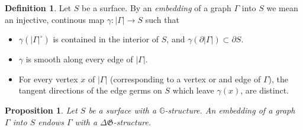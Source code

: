 \documentclass[english,11pt,leqno]{article}
\def\GG{\mathbb{G}}
\def\Gen{\mathfrak{G}}
\def\DG{ {\Delta \Gen}}
\newtheorem{prop}[thm]{Proposition}
\theoremstyle{definition}
\newtheorem{defi}[thm]{Definition}
\theoremstyle{remark}
\numberwithin{equation}{section}
\begin{document}
\begin{defi} \label{exa:embedding} Let $S$ be a surface. By an {\em embedding}
	of a graph  $\Gamma$ into $S$ we mean an injective, continous map $\gamma: |\Gamma| \to S$ such
	that
	\begin{itemize}
		\item $\gamma(|\Gamma|^\circ)$ is contained in the interior of $S$, and $\gamma(\partial|\Gamma|)\subset\partial S$.
		\item $\gamma$ is smooth along every edge of $|\Gamma|$.
		\item For every vertex $x$ of $|\Gamma|$ (corresponding to a vertex or
			and edge of $\Gamma$), the tangent directions of the edge germs on
		$S$ which leave $\gamma(x)$, are distinct.
	\end{itemize}
\end{defi}
	
\begin{prop}\label{prop:emb-graph-str}
	Let $S$ be a surface with a $\GG$-structure. An embedding of a graph $\Gamma$ into $S$ endows $\Gamma$
	with a $\DG$-structure. 
\end{prop}
\end{document}
